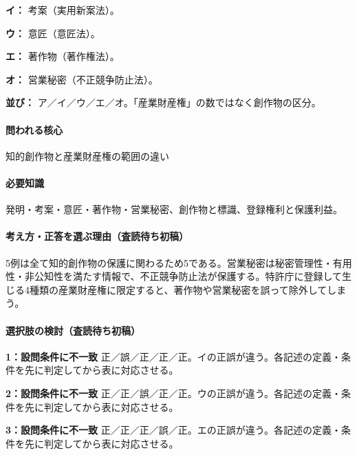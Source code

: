 \noindent\textbf{イ：} 考案（実用新案法）。\par

\noindent\textbf{ウ：} 意匠（意匠法）。\par

\noindent\textbf{エ：} 著作物（著作権法）。\par

\noindent\textbf{オ：} 営業秘密（不正競争防止法）。\par

\noindent\textbf{並び：} ア／イ／ウ／エ／オ。「産業財産権」の数ではなく創作物の区分。\par

\paragraph{問われる核心} 知的創作物と産業財産権の範囲の違い

\paragraph{必要知識} 発明・考案・意匠・著作物・営業秘密、創作物と標識、登録権利と保護利益。

\paragraph{考え方・正答を選ぶ理由（査読待ち初稿）} 5例は全て知的創作物の保護に関わるため5である。営業秘密は秘密管理性・有用性・非公知性を満たす情報で、不正競争防止法が保護する。特許庁に登録して生じる4種類の産業財産権に限定すると、著作物や営業秘密を誤って除外してしまう。

\paragraph{選択肢の検討（査読待ち初稿）}\mbox{}\par

\noindent\textbf{1：設問条件に不一致} 正／誤／正／正／正。イの正誤が違う。各記述の定義・条件を先に判定してから表に対応させる。\par

\noindent\textbf{2：設問条件に不一致} 正／正／誤／正／正。ウの正誤が違う。各記述の定義・条件を先に判定してから表に対応させる。\par

\noindent\textbf{3：設問条件に不一致} 正／正／正／誤／正。エの正誤が違う。各記述の定義・条件を先に判定してから表に対応させる。\par

